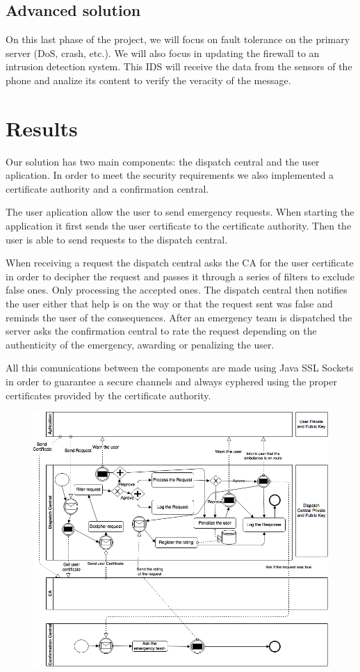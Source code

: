 \documentclass[a4paper,titlepage,11pt]{article}
\begin{document}
\subsection{Advanced solution}
On this last phase of the project, we will focus on fault tolerance on the primary server (DoS, crash, etc.).
We will also focus in updating the firewall to an intrusion detection system. This IDS will receive the data
from the sensors of the phone and analize its content to verify the veracity of the message.


\section{Results}
Our solution has two main components: the dispatch central and the user aplication.
In order to meet the security requirements we also implemented a certificate authority and a confirmation central.

The user aplication allow the user to send emergency requests. When starting the application it first sends
the user certificate to the certificate authority. Then the user is able to send requests to the dispatch central.

When receiving a request the dispatch central asks the CA for the user certificate in order to decipher the request and
passes it through a series of filters to exclude false ones. Only processing the accepted ones. The dispatch central then
notifies the user either that help is on the way or that the request sent was false and reminds the user of the consequences.
After an emergency team is dispatched the server asks the confirmation central to rate the request depending on the
authenticity of the emergency, awarding or penalizing the user.

All this comunications between the components are made using Java SSL Sockets in order to guarantee a secure channels and
always cyphered using the proper certificates provided by the certificate authority.

\begin{figure}[ht]
    \centering
    \includegraphics[scale=0.45]{img/advanced-solution.png}
\end{figure}
\end{document}
